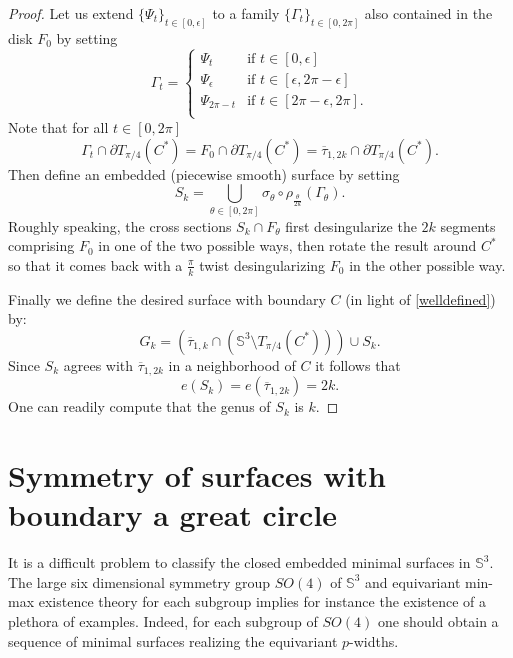 \documentclass[11pt, reqno]{amsart}
\numberwithin{equation}{section}
\begin{document}
\begin{proof}
Let us extend $\{\Psi_t\}_{t\in [0,\epsilon]}$ to a family $\{\Gamma_t\}_{t\in [0,2\pi]}$ also contained in the disk $F_0$ by setting
\begin{equation}
\Gamma_t = 
\begin{cases} 
  \Psi_t & \text{if } t\in [0,\epsilon]\\ 
  
  \Psi_\epsilon& \text{if } t\in [\epsilon,2\pi-\epsilon]\\
  \Psi_{2\pi-t} & \text{if } t\in [2\pi-\epsilon,2\pi]. \\
\end{cases}
\end{equation}
Note that for all $t\in [0,2\pi]$
\begin{equation}\label{welldefined}
\Gamma_t\cap \partial T_{\pi/4}(C^*) = F_0\cap \partial T_{\pi/4}(C^*) =\overline{\tau}_{1,2k}\cap \partial T_{\pi/4}(C^*).
\end{equation} Then define an embedded (piecewise smooth) surface by setting
\begin{equation}
S_k=\bigcup_{\theta\in [0,2\pi]}\sigma_\theta \circ \rho_{\frac{\theta}{2k}}(\Gamma_\theta).
\end{equation}
Roughly speaking, the cross sections $S_k\cap F_\theta$ first desingularize the $2k$ segments comprising $F_0$ in one of the two possible ways, then rotate the result around $C^*$ so that it comes back with a $\frac{\pi}{k}$ twist desingularizing $F_0$ in the other possible way. 

Finally we define the desired surface with boundary $C$ (in light of \eqref{welldefined}) by:
\begin{equation}
G_k = (\overline{\tau}_{1,k}\cap (\mathbb{S}^3\setminus T_{\pi/4}(C^*)))\cup S_k.
\end{equation}
Since $S_k$ agrees with $\overline{\tau}_{1,2k}$ in a neighborhood of $C$ it follows that \begin{equation}e(S_k)=e(\overline{\tau}_{1,2k})=2k.\end{equation}  
One can readily compute that the genus of $S_k$ is $k$.
\end{proof}

\section{Symmetry of surfaces with boundary a great circle}\label{symmetrysection}

It is a difficult problem to classify the closed embedded minimal surfaces in $\mathbb{S}^3$.  The large six dimensional symmetry group $SO(4)$ of $\mathbb{S}^3$ and equivariant min-max existence theory for each subgroup implies for instance the existence of a plethora of examples.  Indeed, for each subgroup of $SO(4)$ one should obtain a sequence of minimal surfaces realizing the equivariant $p$-widths.
\end{document}
